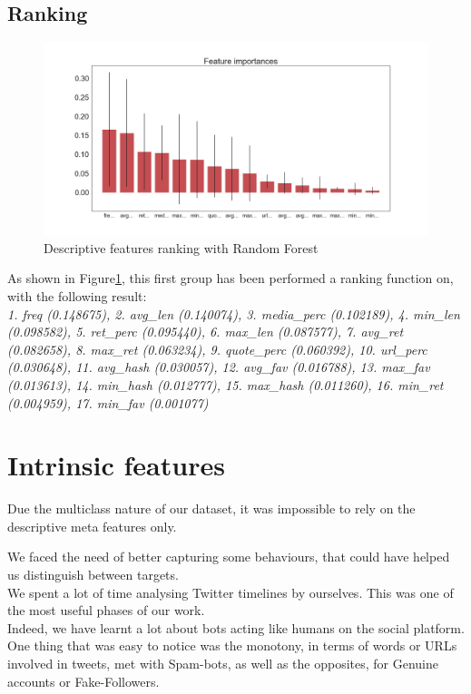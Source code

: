 \subsection{Ranking}
\begin{figure}[htp!]
	\centering
	\includegraphics[width=\columnwidth]{chapter4/figure/desc_features_importances.png}
	\caption{Descriptive features ranking with Random Forest}
	\label{fig:desc_rank}
\end{figure}
As shown in Figure\ref{fig:desc_rank}, this first group has been performed a ranking function on, with the following result:\\
\textit{1. freq (0.148675), 2. avg\_len (0.140074), 3. media\_perc (0.102189), 4. min\_len (0.098582), 5. ret\_perc (0.095440), 6. max\_len (0.087577), 7. avg\_ret (0.082658), 8. max\_ret (0.063234), 9. quote\_perc (0.060392), 10. url\_perc (0.030648), 11. avg\_hash (0.030057), 12. avg\_fav (0.016788), 13. max\_fav (0.013613), 14. min\_hash (0.012777), 15. max\_hash (0.011260), 16. min\_ret (0.004959), 17. min\_fav (0.001077)}



\section{Intrinsic features}
Due the multiclass nature of our dataset, it was impossible to rely on the descriptive meta features only.

We faced the need of better capturing some behaviours, that could have helped us distinguish between targets.\\
We spent a lot of time analysing Twitter timelines by ourselves. This was one of the most useful phases of our work.\\
Indeed, we have learnt a lot about bots acting like humans on the social platform.
One thing that was easy to notice was the monotony, in terms of words or URLs involved in tweets, met with Spam-bots, as well as the opposites, for Genuine accounts or Fake-Followers.

